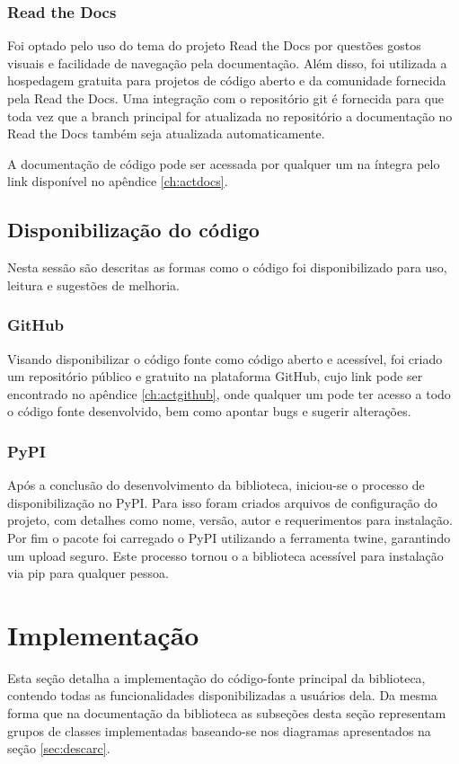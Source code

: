 \subsubsection{Read the Docs}

Foi optado pelo uso do tema do projeto Read the Docs por questões gostos visuais e facilidade de navegação pela
documentação.
Além disso, foi utilizada a hospedagem gratuita para projetos de código aberto e da comunidade fornecida pela Read the
Docs.
Uma integração com o repositório git é fornecida para que toda vez que a branch principal for atualizada no repositório
a documentação no Read the Docs também seja atualizada automaticamente.

A documentação de código pode ser acessada por qualquer um na íntegra pelo link disponível no apêndice \ref{ch:actdocs}.

\subsection{Disponibilização do código}

Nesta sessão são descritas as formas como o código foi disponibilizado para uso, leitura e sugestões de melhoria.

\subsubsection{GitHub}

Visando disponibilizar o código fonte como código aberto e acessível, foi criado um repositório público e gratuito na
plataforma GitHub, cujo link pode ser encontrado no apêndice \ref{ch:actgithub}, onde qualquer um pode ter acesso a todo
o código fonte desenvolvido, bem como apontar bugs e sugerir alterações.

\subsubsection{PyPI}

Após a conclusão do desenvolvimento da biblioteca, iniciou-se o processo de disponibilização no PyPI\@.
Para isso foram criados arquivos de configuração do projeto, com detalhes como nome, versão, autor e requerimentos
para instalação.
Por fim o pacote foi carregado o PyPI utilizando a ferramenta twine, garantindo um upload seguro.
Este processo tornou o a biblioteca acessível para instalação via pip para qualquer pessoa.

\section{Implementação}
Esta seção detalha a implementação do código-fonte principal da biblioteca, contendo todas as funcionalidades
disponibilizadas a usuários dela.
Da mesma forma que na documentação da biblioteca as subseções desta seção representam grupos de classes implementadas
baseando-se nos diagramas apresentados na seção \ref{sec:descarc}.

